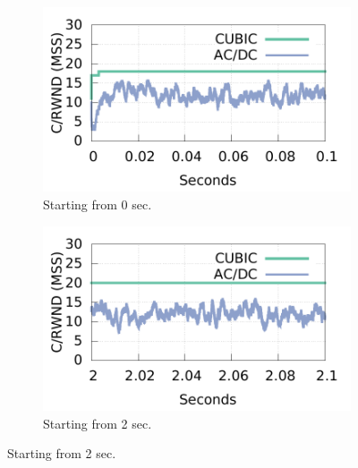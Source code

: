 \begin{figure}[!t]
        \centering
        \begin{subfigure}[b]{0.45\textwidth}
                \centering
                \includegraphics[width=\textwidth]{acdctcp/figures/cwnd_rwnd2/mtu1500_cubic/cubic_measure_cwnd_rwnd_gap_15k_5flows_0sec_100msec.pdf}
                \caption{Starting from 0 sec.}
                \label{who_limits_cwnd_rwnd_1500_0sec}
        \end{subfigure}
        \begin{subfigure}[b]{0.45\textwidth}
                \centering
                \includegraphics[width=\textwidth]{acdctcp/figures/cwnd_rwnd2/mtu1500_cubic/cubic_measure_cwnd_rwnd_gap_15k_5flows_2sec_100msec.pdf}
                \caption{Starting from 2 sec.}
                \label{who_limits_cwnd_rwnd_1500_2sec}
        \end{subfigure}

\end{figure}
